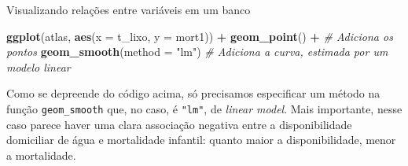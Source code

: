\documentclass[
  9pt,
  ignorenonframetext,
  aspectratio=169]{beamer}
\newenvironment{Shaded}{\begin{snugshade}}{\end{snugshade}}
\newcommand{\CommentTok}[1]{\textcolor[rgb]{0.56,0.35,0.01}{\textit{#1}}}
\newcommand{\DataTypeTok}[1]{\textcolor[rgb]{0.13,0.29,0.53}{#1}}
\newcommand{\KeywordTok}[1]{\textcolor[rgb]{0.13,0.29,0.53}{\textbf{#1}}}
\newcommand{\NormalTok}[1]{#1}
\newcommand{\OperatorTok}[1]{\textcolor[rgb]{0.81,0.36,0.00}{\textbf{#1}}}
\newcommand{\StringTok}[1]{\textcolor[rgb]{0.31,0.60,0.02}{#1}}
\begin{document}
\begin{frame}[fragile]{Visualizando relações entre variáveis em um
banco}
\begin{Shaded}
\begin{Highlighting}[]
\KeywordTok{ggplot}\NormalTok{(atlas, }\KeywordTok{aes}\NormalTok{(}\DataTypeTok{x =}\NormalTok{ t\_lixo, }\DataTypeTok{y =}\NormalTok{ mort1)) }\OperatorTok{+}\StringTok{ }
\StringTok{  }\KeywordTok{geom\_point}\NormalTok{() }\OperatorTok{+}\StringTok{ }\CommentTok{\# Adiciona os pontos}
\StringTok{  }\KeywordTok{geom\_smooth}\NormalTok{(}\DataTypeTok{method =} \StringTok{"lm"}\NormalTok{) }\CommentTok{\# Adiciona a curva, estimada por um modelo linear}
\end{Highlighting}
\end{Shaded}

Como se depreende do código acima, só precisamos especificar um método
na função \texttt{geom\_smooth} que, no caso, é \texttt{"lm"}, de
\emph{linear model}. Mais importante, nesse caso parece haver uma clara
associação negativa entre a disponibilidade domiciliar de água e
mortalidade infantil: quanto maior a disponibilidade, menor a
mortalidade.
\end{frame}
\end{document}
